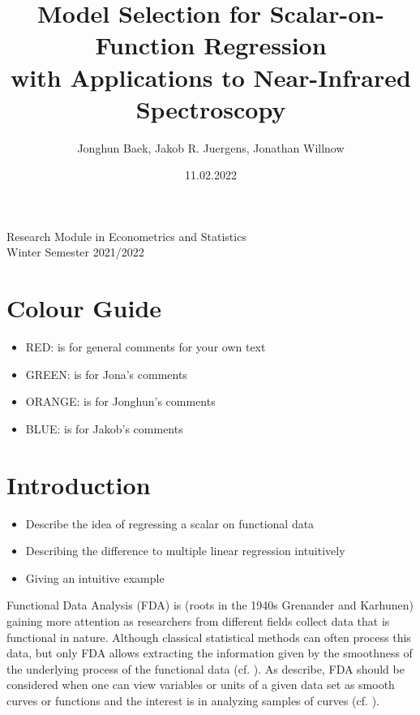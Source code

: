 \documentclass[11pt,twoside,a4paper]{article}
\begin{document}
	\title{{\LARGE Model Selection for Scalar-on-Function Regression \\ with Applications to Near-Infrared Spectroscopy}}
	\author{Jonghun Baek, Jakob R. Juergens, Jonathan Willnow}
	\date{11.02.2022}
	\maketitle
	\vspace{1.5 cm}
	\begin{center}
		Research Module in Econometrics and Statistics \\
		Winter Semester 2021/2022
	\end{center}
	
	\newpage
	
	\tableofcontents
	
	\newpage
	
	\section{Colour Guide}
		\begin{itemize}
			\item {\color{red} RED}: is for general comments for your own text
			\item {\color{green} GREEN}: is for Jona's comments
			\item {\color{orange} ORANGE}: is for Jonghun's comments
			\item {\color{blue} BLUE}: is for Jakob's comments
		\end{itemize}
	
	\section{Introduction}
	
	\begin{itemize}
		\item Describe the idea of regressing a scalar on functional data
		\item Describing the difference to multiple linear regression intuitively
		\item Giving an intuitive example
	\end{itemize}	
	Functional Data Analysis (FDA) is {\color{red} (roots in the 1940s Grenander and Karhunen)} gaining more attention as researchers from different fields collect data that is functional in nature. Although classical statistical methods can often process this data, but only FDA allows extracting the information given by the smoothness of the underlying process of the functional data (cf. \cite{levitin_introduction_2007}).
	 As \cite{kokoszka_introduction_2017} describe, FDA should be considered when one can view variables or units of a given data set as smooth curves or functions and the interest is in analyzing samples of curves (cf. \cite[S.~17]{kokoszka_introduction_2017}).\\
	 
\end{document}
